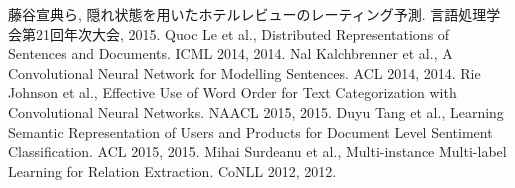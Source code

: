 \documentclass{ttisummary}
\begin{document}
%
%







\begin{thebibliography}{9}
  藤谷宣典ら,
  隠れ状態を用いたホテルレビューのレーティング予測.
  言語処理学会第21回年次大会, 2015.
  Quoc Le et al.,
  Distributed Representations of Sentences and Documents.
  ICML 2014, 2014.
  Nal Kalchbrenner et al.,
  A Convolutional Neural Network for Modelling Sentences.
  ACL 2014, 2014.
  Rie Johnson et al.,
  Effective Use of Word Order for Text Categorization
  with Convolutional Neural Networks.
  NAACL 2015, 2015.
  Duyu Tang et al.,
  Learning Semantic Representation of Users and Products
  for Document Level Sentiment Classification.
  ACL 2015, 2015.
  Mihai Surdeanu et al.,
  Multi-instance Multi-label Learning for Relation Extraction.
  CoNLL 2012, 2012.
\end{thebibliography}
\end{document}

